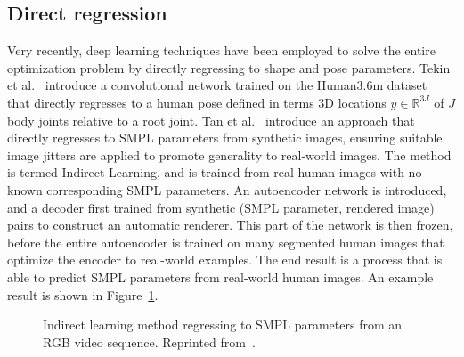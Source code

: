     \subsection{Direct regression}
    Very recently, deep learning techniques have been employed to solve the entire optimization problem by directly regressing to shape and pose parameters. Tekin et al.~\cite{tekin2016direct} introduce a convolutional network trained on the Human3.6m dataset~\cite{lin2014microsoft} that directly regresses to a human pose defined in terms 3D locations $y \in \mathbb{R}^{3J}$ of $J$ body joints relative to a root joint. Tan et al.~\cite{tan17indirect} introduce an approach that directly regresses to SMPL parameters from synthetic images, ensuring suitable image jitters are applied to promote generality to real-world images. The method is termed Indirect Learning, and is trained from real human images with no known corresponding SMPL parameters. An autoencoder network is introduced, and a decoder first trained from synthetic (SMPL parameter, rendered image) pairs to construct an automatic renderer. This part of the network is then frozen, before the entire autoencoder is trained on many segmented human images that optimize the encoder to real-world examples. The end result is a process that is able to predict SMPL parameters from real-world human images. An example result is shown in Figure~\ref{fig:indirect_learning}.

    \begin{figure}[H] %
        \caption{Indirect learning method regressing to SMPL parameters from an RGB video sequence. Reprinted from~\cite{tan17indirect}.}
        \label{fig:indirect_learning}
    \end{figure}


